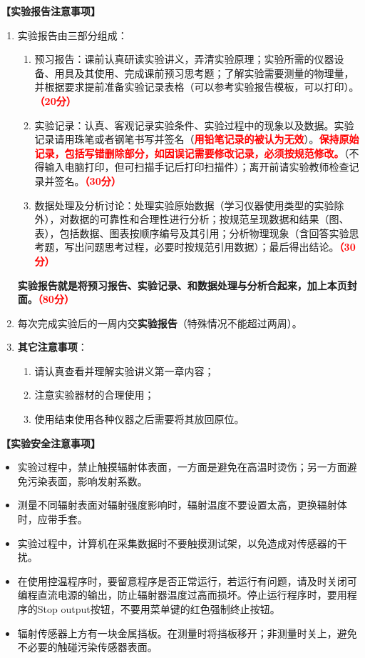 \documentclass[dvipsnames, svgnames,a4paper,11pt]{article}
\begin{document}
	\textbf{【实验报告注意事项】}
	\begin{enumerate}
		\item 实验报告由三部分组成：
		\begin{enumerate}
			\item 预习报告：课前认真研读实验讲义，弄清实验原理；实验所需的仪器设备、用具及其使用、完成课前预习思考题；了解实验需要测量的物理量，并根据要求提前准备实验记录表格（可以参考实验报告模板，可以打印）。\textcolor{red}{\textbf{（20分）}}
			\item 实验记录：认真、客观记录实验条件、实验过程中的现象以及数据。实验记录请用珠笔或者钢笔书写并签名（\textcolor{red}{\textbf{用铅笔记录的被认为无效}}）。\textcolor{red}{\textbf{保持原始记录，包括写错删除部分，如因误记需要修改记录，必须按规范修改。}}（不得输入电脑打印，但可扫描手记后打印扫描件）；离开前请实验教师检查记录并签名。\textcolor{red}{\textbf{（30分）}}
			\item 数据处理及分析讨论：处理实验原始数据（学习仪器使用类型的实验除外），对数据的可靠性和合理性进行分析；按规范呈现数据和结果（图、表），包括数据、图表按顺序编号及其引用；分析物理现象（含回答实验思考题，写出问题思考过程，必要时按规范引用数据）；最后得出结论。\textcolor{red}{\textbf{（30分）}}
		\end{enumerate}
		\textbf{实验报告就是将预习报告、实验记录、和数据处理与分析合起来，加上本页封面。\textcolor{red}{（80分）}}
		\item 每次完成实验后的一周内交\textbf{实验报告}（特殊情况不能超过两周）。
		\item \textbf{其它注意事项}：
		\begin{enumerate}
			\item 请认真查看并理解实验讲义第一章内容；
			\item 注意实验器材的合理使用；
			\item 使用结束使用各种仪器之后需要将其放回原位。
		\end{enumerate}
	\end{enumerate}
	
	\textbf{【实验安全注意事项】}	
	\begin{itemize}
		\item 实验过程中，禁止触摸辐射体表面，一方面是避免在高温时烫伤；另一方面避免污染表面，影响发射系数。
		\item 测量不同辐射表面对辐射强度影响时，辐射温度不要设置太高，更换辐射体时，应带手套。
		\item 实验过程中，计算机在采集数据时不要触摸测试架，以免造成对传感器的干扰。
		\item 在使用控温程序时，要留意程序是否正常运行，若运行有问题，请及时关闭可编程直流电源的输出，防止辐射器温度过高而损坏。停止运行程序时，要用程序的Stop output按钮，不要用菜单键的红色强制终止按钮。
		\item 辐射传感器上方有一块金属挡板。在测量时将挡板移开；非测量时关上，避免不必要的触碰污染传感器表面。
	  \end{itemize}
	
\end{document}
